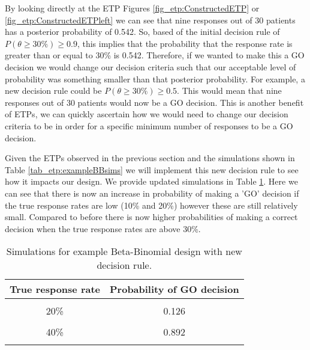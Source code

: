 By looking directly at the ETP Figures \ref{fig_etp:ConstructedETP} or \ref{fig_etp:ConstructedETPleft} we can see that nine responses out of 30 patients has a posterior probability of 0.542. So, based of the initial decision rule of $P(\theta  \geq 30\%) \geq 0.9$, this implies that the probability that the response rate is greater than or equal to 30\% is 0.542. Therefore, if we wanted to make this a GO decision we would change our decision criteria such that our acceptable level of probability was something smaller than that posterior probability. For example, a new decision rule could be $P(\theta  \geq 30\%) \geq 0.5$. This would mean that nine responses out of 30 patients would now be a GO decision. This is another benefit of ETPs, we can quickly ascertain how we would need to change our decision criteria to be in order for a specific minimum number of responses to be a GO decision. 

Given the ETPs observed in the previous section and the simulations shown in Table \ref{tab_etp:exampleBBsims} we will implement this new decision rule to see how it impacts our design. We provide updated simulations in Table \ref{tab_etp:exampleBBsims2}. Here we can see that there is now an increase in probability of making a 'GO' decision if the true response rates are low (10\% and 20\%) however these are still relatively small. Compared to before there is now higher probabilities of making a correct decision when the true response rates are above 30\%. 
	
	\begin{table}[H]
		\caption{\label{tab_etp:exampleBBsims2}Simulations for example Beta-Binomial design with new decision rule.}
		\centering
		\begin{tabular}[t]{cc}
			\toprule
			True response rate & Probability of GO decision\\
			\midrule
			\cellcolor{gray!6}{10\%} & \cellcolor{gray!6}{0.001}\\
			20\% & 0.126\\
			\cellcolor{gray!6}{30\%} & \cellcolor{gray!6}{0.558}\\
			40\% & 0.892\\
			\cellcolor{gray!6}{50\%} & \cellcolor{gray!6}{0.988}\\
			\bottomrule
		\end{tabular}
	\end{table}

